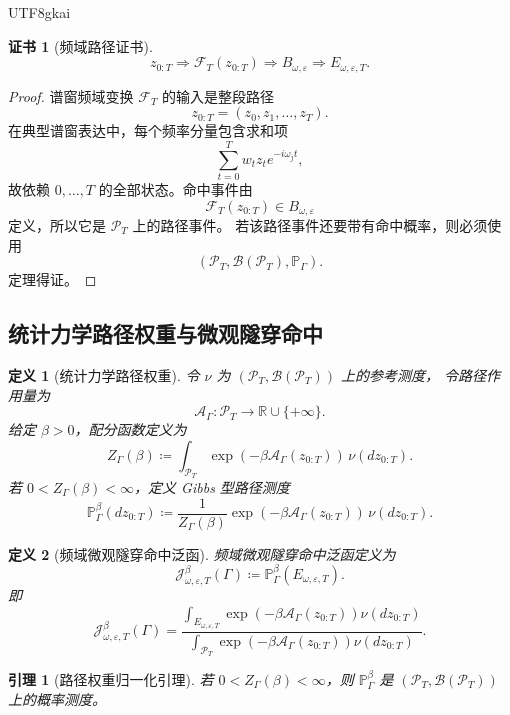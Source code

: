 \documentclass[12pt]{article}
\newtheorem{definition}{定义}[section]
\newtheorem{lemma}{引理}[section]
\newtheorem{Certificate}{证书}[section]
\newcommand{\RR}{\mathbb{R}}
\newcommand{\DefEq}{\coloneqq}
\newcommand{\Prob}{\mathbb P}
\begin{document}
\begin{CJK*}{UTF8}{gkai}
\begin{Certificate}[频域路径证书]
\[
\boxed{
z_{0:T}
\Rightarrow
\mathscr F_T(z_{0:T})
\Rightarrow
B_{\omega,\varepsilon}
\Rightarrow
E_{\omega,\varepsilon,T}.
}
\]
\end{Certificate}

\begin{proof}
谱窗频域变换 \(\mathscr F_T\) 的输入是整段路径
\[
z_{0:T}=(z_0,z_1,\ldots,z_T).
\]
在典型谱窗表达中，每个频率分量包含求和项
\[
\sum_{t=0}^{T}w_tz_te^{-i\omega_jt},
\]
故依赖 \(0,\ldots,T\) 的全部状态。命中事件由
\[
\mathscr F_T(z_{0:T})\in B_{\omega,\varepsilon}
\]
定义，所以它是 \(\mathcal P_T\) 上的路径事件。
若该路径事件还要带有命中概率，则必须使用
\[
(\mathcal P_T,\mathscr B(\mathcal P_T),\Prob_\Gamma).
\]
定理得证。
\end{proof}

\subsection{统计力学路径权重与微观隧穿命中}
\label{subsec:statistical-path-weight-tunneling}

\begin{definition}[统计力学路径权重]
令 \(\nu\) 为 \((\mathcal P_T,\mathscr B(\mathcal P_T))\) 上的参考测度，
令路径作用量为
\[
\mathcal A_\Gamma:\mathcal P_T\to\RR\cup\{+\infty\}.
\]
给定 \(\beta>0\)，配分函数定义为
\[
Z_\Gamma(\beta)
\DefEq
\int_{\mathcal P_T}
\exp\!\left(-\beta\mathcal A_\Gamma(z_{0:T})\right)\,
\nu(dz_{0:T}).
\]
若 \(0<Z_\Gamma(\beta)<\infty\)，定义 Gibbs 型路径测度
\[
\boxed{
\Prob_\Gamma^\beta(dz_{0:T})
\DefEq
\frac{1}{Z_\Gamma(\beta)}
\exp\!\left(-\beta\mathcal A_\Gamma(z_{0:T})\right)\,
\nu(dz_{0:T}).
}
\]
\end{definition}

\begin{definition}[频域微观隧穿命中泛函]
频域微观隧穿命中泛函定义为
\[
\boxed{
\mathcal J_{\omega,\varepsilon,T}^{\beta}(\Gamma)
\DefEq
\Prob_\Gamma^\beta(E_{\omega,\varepsilon,T}).
}
\]
即
\[
\mathcal J_{\omega,\varepsilon,T}^{\beta}(\Gamma)
=
\frac{
\int_{E_{\omega,\varepsilon,T}}
\exp\!\left(-\beta\mathcal A_\Gamma(z_{0:T})\right)\nu(dz_{0:T})
}{
\int_{\mathcal P_T}
\exp\!\left(-\beta\mathcal A_\Gamma(z_{0:T})\right)\nu(dz_{0:T})
}.
\]
\end{definition}

\begin{lemma}[路径权重归一化引理]
若 \(0<Z_\Gamma(\beta)<\infty\)，则 \(\Prob_\Gamma^\beta\) 是
\((\mathcal P_T,\mathscr B(\mathcal P_T))\) 上的概率测度。
\end{lemma}


\end{CJK*}
\end{document}

